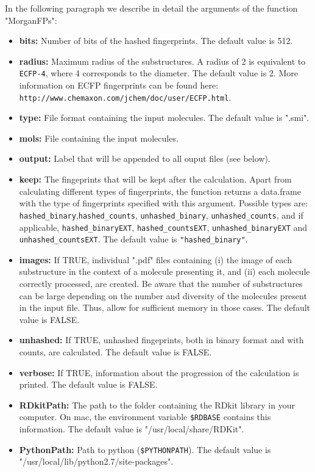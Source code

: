 \documentclass[twoside,a4wide,12pt]{article}\usepackage[]{graphicx}\usepackage[]{color}
\begin{document}
In the following paragraph we describe in detail the arguments of the function "MorganFPs":
\begin{itemize}
\item {\bf bits:} Number of bits of the hashed fingerprints. The default value is 512.
\item {\bf radius:} Maximum radius of the substructures. A radius of 2 is equivalent to \verb|ECFP-4|, where 4 corresponds to the diameter. The default value is 2.
More information on ECFP fingerprints can be found here: \verb|http://www.chemaxon.com/jchem/doc/user/ECFP.html|.
\item {\bf type:} File format containing the input molecules. The default value is ".smi".
\item {\bf mols:} File containing the input molecules.
\item {\bf output:} Label that will be appended to all ouput files (see below).
\item {\bf keep:} The fingeprints that will be kept after the calculation.
Apart from calculating different types of fingerprints, the function returns a data.frame with the type of fingerprints specified with this argument.  Possible types are: \verb|hashed_binary|,\verb|hashed_counts|, \verb|unhashed_binary|, \verb|unhashed_counts|, and if applicable, \verb|hashed_binaryEXT|, \verb|hashed_countsEXT|, \verb|unhashed_binaryEXT| and \verb|unhashed_countsEXT|.
The default value is \verb|"hashed_binary"|.
\item {\bf images:} If TRUE, individual ".pdf" files containing (i) the image of each substructure in the context of a molecule presenting it, and (ii) each molecule correctly processed, are created.  Be aware that the number of substructures can be large depending on the number and diversity of the molecules present in the input file. Thus, allow for sufficient memory in those cases.
The default value is FALSE.
\item {\bf unhashed:} If TRUE, unhashed fingeprints, both in binary format and with counts, are calculated. The default value is FALSE.
\item {\bf verbose:} If TRUE, information about the progression of the calculation is printed. The default value is FALSE.
\item {\bf RDkitPath:} The path to the folder containing the RDkit library in your computer. On mac, the environment variable \verb|$RDBASE| contains this information. The default value is "/usr/local/share/RDKit".
\item {\bf PythonPath:} Path to python (\verb|$PYTHONPATH|). The default value is "/usr/local/lib/python2.7/site-packages".

\end{itemize}
\end{document}
